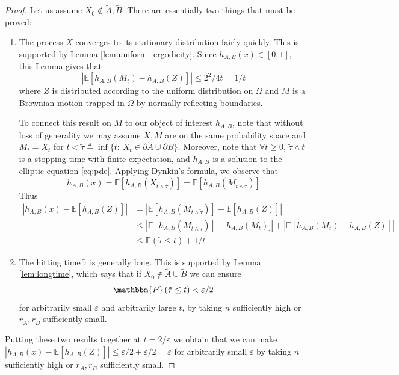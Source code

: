 \documentclass[12pt, nofootinbib,english, amsmath, amssymb, aps, priprint, graphicx,floatfix]{revtex4-1}
\theoremstyle{plain}
\theoremstyle{definition}
\theoremstyle{plain}
\begin{document}
\begin{proof}
Let us assume $X_0 \notin \tilde A,\tilde B$.  There are essentially two things that must be proved:
\begin{enumerate}
\item The process $X$ converges to its stationary distribution fairly quickly.  This is supported by Lemma \ref{lem:uniform_ergodicity}.  Since $h_{A,B}(x) \in [0,1]$, this Lemma gives that
%
\[
|\mathbb{E}[h_{A,B}(M_t)-h_{A,B}(Z)]| \leq 2^2/4t =1/t
\]
%
where $Z$ is distributed according to the uniform distribution on $\Omega$ and $M$ is a Brownian motion trapped in $\Omega$ by normally reflecting boundaries.  

To connect this result on $M$ to our object of interest $h_{A,B}$, note that without loss of generality we may assume $X,M$ are on the same probability space and $M_t=X_t$ for $t<\tilde\tau \triangleq \inf \{t:\ X_t \in \partial \dot A \cup \partial \dot B\}$.  Moreover, note that $\forall t \geq 0$, $\tilde\tau\wedge t$ is a stopping time with finite expectation, and $h_{A,B}$ is a solution to the elliptic equation \ref{eq:pde}. Applying Dynkin's formula, we observe that 
%
\[
h_{A,B}(x) = \mathbb{E} [h_{A,B}(X_{t\wedge\tilde\tau})] = \mathbb{E} [h_{A,B}(M_{t\wedge\tilde\tau})]
\]
%
Thus
\begin{align*}
|h_{A,B}(x) - \mathbb{E}[h_{A,B}(Z)]| &= |\mathbb{E} [h_{A,B}(M_{t\wedge\tilde\tau})] - \mathbb{E}[h_{A,B}(Z)]|\\
&\leq |\mathbb{E} [h_{A,B}(M_{t\wedge\tilde\tau})] - h_{A,B}(M_t)]| + |\mathbb{E} [h_{A,B}(M_{t}) - h_{A,B}(Z)]|\\
&\leq \mathbb{P}(\tilde \tau \leq t) + 1/t
\end{align*}
%

\item The hitting time $\tilde \tau$ is generally long.  This is supported by Lemma \ref{lem:longtime}, which says that if $X_0 \not\in\tilde{A} \cup \tilde{B}$ we can ensure
%
\[
\mathbbm{P} \left( \tilde{\tau} \leq t \right) < \varepsilon/2
\]
%
for arbitrarily small $\varepsilon$ and arbitrarily large $t$, by taking $n$ sufficiently high or $r_{\dot A},r_{\dot B}$ sufficiently small.
\end{enumerate}
Putting these two results together at $t=2/\varepsilon$ we obtain that we can make $|h_{A,B}(x) - \mathbb{E}[h_{A,B}(Z)]| \leq \varepsilon / 2 + \varepsilon/2 = \varepsilon$ for arbitrarily small $\varepsilon$ by taking $n$ sufficiently high or $r_{\dot A},r_{\dot B}$ sufficiently small.
\end{proof}
\end{document}
